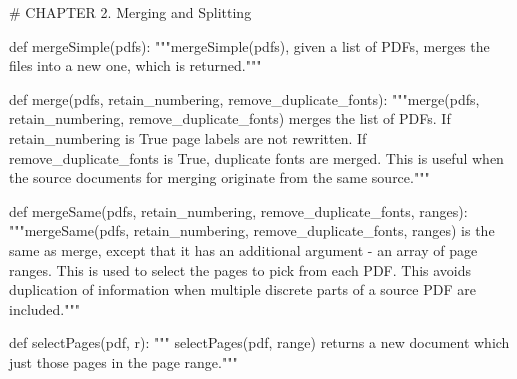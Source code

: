 # CHAPTER 2. Merging and Splitting

def mergeSimple(pdfs):
    """mergeSimple(pdfs), given a list of PDFs,
    merges the files into a new one, which is returned."""

def merge(pdfs, retain_numbering, remove_duplicate_fonts):
    """merge(pdfs, retain_numbering, remove_duplicate_fonts) merges
    the list of PDFs. If retain_numbering is True page labels are not
    rewritten. If remove_duplicate_fonts is True, duplicate fonts are merged.
    This is useful when the source documents for merging originate from the
    same source."""

def mergeSame(pdfs, retain_numbering, remove_duplicate_fonts, ranges):
    """mergeSame(pdfs, retain_numbering, remove_duplicate_fonts, ranges)
    is the same as merge, except that it has an additional argument
    - an array of page ranges. This is used to select the pages to pick from
    each PDF. This avoids duplication of information when multiple discrete
    parts of a source PDF are included."""

def selectPages(pdf, r):
    """ selectPages(pdf, range) returns a new document which just those pages
    in the page range."""

